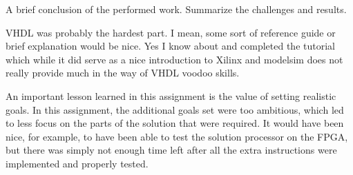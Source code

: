 A brief conclusion of the performed work.
Summarize the challenges and results.


VHDL was probably the hardest part. I mean, some sort of reference guide or brief explanation would be nice. Yes I know about and completed the tutorial which while it did serve as a nice introduction to Xilinx and modelsim does not really provide much in the way of VHDL voodoo skills.

An important lesson learned in this assignment is the value of setting realistic goals.
In this assignment, the additional goals set were too ambitious, which led to less focus on the parts of the solution that were required.
It would have been nice, for example, to have been able to test the solution processor on the FPGA, but there was simply not enough time left after all the extra instructions were implemented and properly tested.
